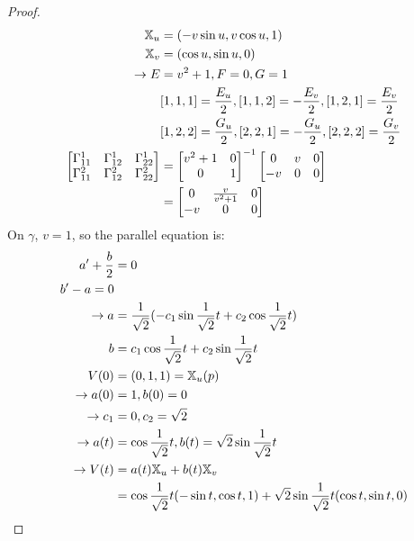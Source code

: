 \documentclass[10pt,a4paper]{article}
\begin{document}
\begin{proof}
\begin{align*}
\mathbb{X}_u&=(-v\sin u, v\cos u, 1)\\
\mathbb{X}_v&=(\cos u, \sin u, 0)\\
\rightarrow E&=v^2+1, F=0, G=1\\
&{[}1,1,1]=\frac{E_u}{2}, {[}1,1,2]=-\frac{E_v}{2}, {[}1,2,1]=\frac{E_v}{2}\\
&{[}1,2,2]=\frac{G_u}{2}, {[}2,2,1]=-\frac{G_u}{2}, {[}2,2,2]=\frac{G_v}{2}\\
\begin{bmatrix}
\Gamma_{11}^1 & \Gamma_{12}^1 & \Gamma_{22}^1\\
\Gamma_{11}^2 & \Gamma_{12}^2 & \Gamma_{22}^2\\
\end{bmatrix}&=
\begin{bmatrix}
v^2+1 & 0\\0 & 1
\end{bmatrix}^{-1}
\begin{bmatrix}
0 & v & 0\\
-v & 0 & 0\\
\end{bmatrix}\\
&=\begin{bmatrix}
0 & \frac{v}{v^2+1} & 0\\
-v & 0 & 0\\
\end{bmatrix}\\
\end{align*}
On $\gamma$, $v=1$, so the parallel equation is:
\begin{align*}
a'+\frac{b}{2}&=0\\
b'-a=0\\
\rightarrow a&=\frac{1}{\sqrt{2}}(-c_1\sin{\frac{1}{\sqrt{2}}t}+c_2\cos{\frac{1}{\sqrt{2}}t})\\
b&=c_1\cos{\frac{1}{\sqrt{2}}t}+c_2\sin{\frac{1}{\sqrt{2}}t}\\
V(0)&=(0, 1, 1)=\mathbb{X}_u(p)\\
\rightarrow a(0)&=1, b(0)=0\\
\rightarrow c_1&=0, c_2=\sqrt{2}\\
\rightarrow a(t)&=\cos{\frac{1}{\sqrt{2}}t}, b(t)=\sqrt{2}\sin{\frac{1}{\sqrt{2}}t}\\
\rightarrow V(t)&=a(t)\mathbb{X}_u+b(t)\mathbb{X}_v\\
&=\cos{\frac{1}{\sqrt{2}}t}(-\sin t, \cos t, 1)+\sqrt{2}\sin{\frac{1}{\sqrt{2}}t}(\cos t, \sin t, 0)
\end{align*}
\end{proof}
\end{document}
